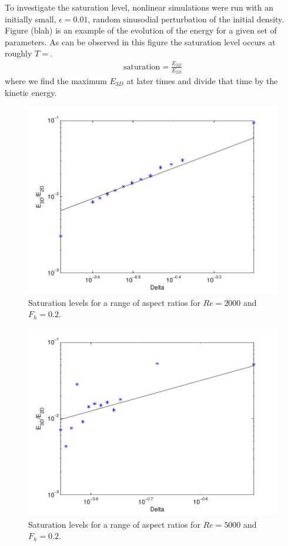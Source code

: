 To investigate the saturation level, nonlinear simulations were run with an initially small, $\epsilon=0.01$, random sinusodial perturbation of the initial density. Figure (blah) is an example of the evolution of the energy for a given set of parameters. As can be observed in this figure the saturation level occurs at roughly $T=$.  
\begin{align}
\text{saturation} = \frac{E_{3D}}{E_{2D}}
\end{align}
where we find the maximum $E_{3D}$ at later times and divide that time by the kinetic energy. 

\begin{figure}
\begin{center}
\includegraphics[width=\textwidth]{re2000_fh02_saturations} 
\caption{Saturation levels for a range of aspect ratios for $Re=2000$ and $F_{h}=0.2$.}
\label{re2000sat}
\end{center}
\end{figure}
\begin{figure}
\begin{center}
\includegraphics[width=\textwidth]{re5000_fh02_saturations} 
\caption{Saturation levels for a range of aspect ratios for $Re=5000$ and $F_{h}=0.2$. }
\label{re5000sat}
\end{center}
\end{figure}
